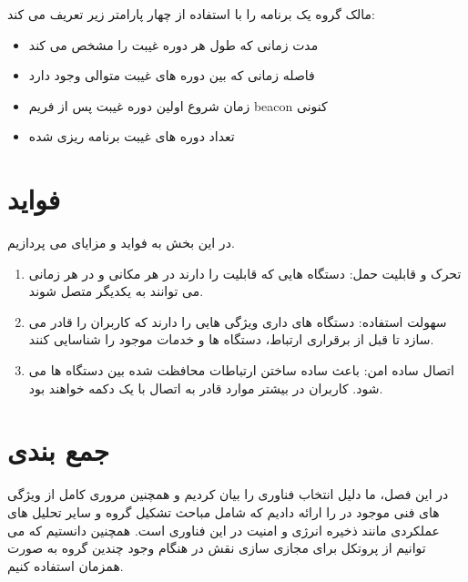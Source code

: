 مالک گروه یک برنامه
  را با استفاده از چهار پارامتر زیر تعریف می کند:
  \begin{itemize}
  	\item مدت زمانی که طول هر دوره غیبت را مشخص می کند
  	\item فاصله زمانی که بین دوره های غیبت متوالی وجود دارد
  	\item زمان شروع اولین دوره غیبت پس از فریم beacon کنونی
  	\item تعداد دوره های غیبت برنامه ریزی شده
  \end{itemize}




\section{فواید}
در این بخش به فواید و مزایای 
می پردازیم.
\begin{enumerate}
	\item تحرک و قابلیت حمل: دستگاه هایی که قابلیت 
	را دارند در هر مکانی و در هر زمانی می توانند به یکدیگر متصل شوند.
	\item سهولت استفاده: دستگاه های داری 
 ویژگی هایی را دارند که کاربران را قادر می سازد تا قبل از برقراری ارتباط، دستگاه ها و خدمات موجود را شناسایی کنند.
     \item اتصال ساده امن: 
      باعث ساده ساختن ارتباطات محافظت شده بین دستگاه ها می شود. کاربران در بیشتر موارد قادر به اتصال با یک دکمه خواهند بود.
\end{enumerate}

\section{جمع بندی}
در این فصل، ما دلیل انتخاب فناوری 
را بیان کردیم  و همچنین مروری کامل از ویژگی های فنی موجود در 
را ارائه دادیم که شامل مباحث تشکیل گروه و سایر تحلیل های عملکردی مانند ذخیره انرژی و امنیت در این فناوری است.
 همچنین دانستیم که می توانیم از پروتکل
 برای مجازی سازی نقش
  در هنگام وجود چندین گروه به صورت همزمان استفاده کنیم.

